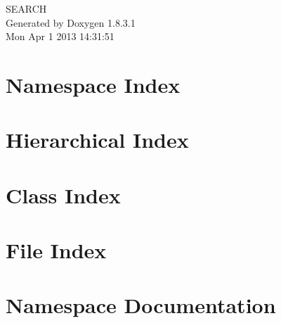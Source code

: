 \documentclass{book}
\begin{document}
\hypersetup{pageanchor=false,citecolor=blue}
\begin{titlepage}
\vspace*{7cm}
\begin{center}
{\Large S\-E\-A\-R\-C\-H }\\
\vspace*{1cm}
{\large Generated by Doxygen 1.8.3.1}\\
\vspace*{0.5cm}
{\small Mon Apr 1 2013 14:31:51}\\
\end{center}
\end{titlepage}
\clearemptydoublepage
{}
\tableofcontents
\clearemptydoublepage
{}
\hypersetup{pageanchor=true,citecolor=blue}
\chapter{Namespace Index}

\chapter{Hierarchical Index}

\chapter{Class Index}

\chapter{File Index}

\chapter{Namespace Documentation}



\end{document}
